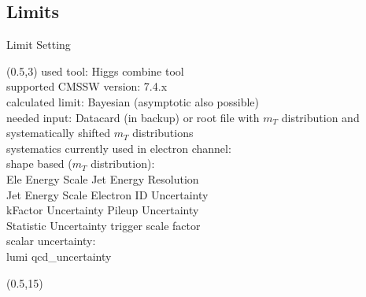 


\subsection{Limits}

\begin{frame}{Limit Setting}
        \begin{textblock}{15}(0.5,3) %
            used tool: Higgs combine tool \\
            supported CMSSW version: 7.4.x\\
            calculated limit: Bayesian (asymptotic also possible)\\
            needed input: Datacard (in backup) or root file with $m_T$ distribution and systematically shifted $m_T$ distributions\\[.75cm]


            systematics currently used in electron channel:\\
            shape based ($m_T$ distribution):\\
            Ele Energy Scale \hspace{3cm} Jet Energy Resolution\\
            Jet Energy Scale\hspace{3cm} Electron ID Uncertainty\\
            kFactor Uncertainty \hspace{3cm} Pileup Uncertainty\\
            Statistic Uncertainty\hspace{3cm} trigger scale factor\\[.25cm]
            scalar uncertainty:\\
            lumi \hspace{5cm} qcd\_uncertainty\\


        \end{textblock}
        \begin{textblock}{15}(0.5,15) %
        \end{textblock}
\end{frame}
